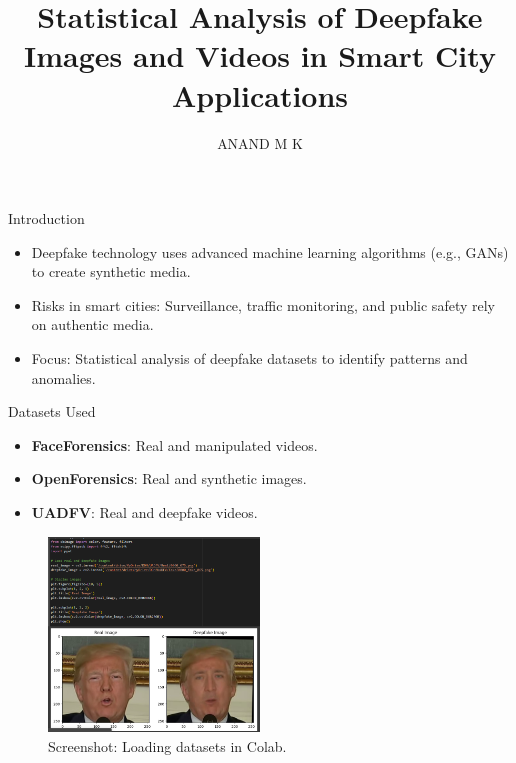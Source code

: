\documentclass{beamer}
\title{Statistical Analysis of Deepfake Images and Videos in Smart City Applications}
\author{ANAND M K}
\institute{242CS008}
\date{}
\begin{document}
\begin{frame}
    \titlepage
\end{frame}

\begin{frame}{Introduction}
    \begin{itemize}
        \item Deepfake technology uses advanced machine learning algorithms (e.g., GANs) to create synthetic media.
        \item Risks in smart cities: Surveillance, traffic monitoring, and public safety rely on authentic media.
        \item Focus: Statistical analysis of deepfake datasets to identify patterns and anomalies.
    \end{itemize}
\end{frame}

\begin{frame}{Datasets Used}
    \begin{itemize}
        \item \textbf{FaceForensics}: Real and manipulated videos.
        \item \textbf{OpenForensics}: Real and synthetic images.
        \item \textbf{UADFV}: Real and deepfake videos.
    \end{itemize}
    \begin{figure}
        \centering
        \includegraphics[width=0.5\textwidth]{dataset_screenshot.png} %
        \caption{Screenshot: Loading datasets in Colab.}
    \end{figure}
\end{frame}
\end{document}
